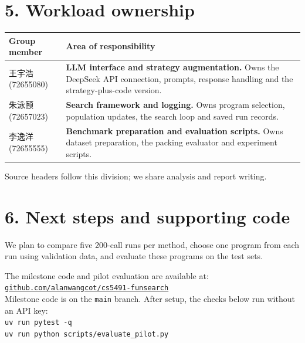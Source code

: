 \documentclass[12pt,a4paper]{article}
\begin{document}
\section*{5. Workload ownership}
\begin{tabularx}{\linewidth}{@{}p{4.1cm}Y@{}}
\toprule
\textbf{Group member} & \textbf{Area of responsibility}\\
\midrule
王宇浩 (72655080) & \textbf{LLM interface and strategy augmentation.} Owns the DeepSeek API connection, prompts, response handling and the strategy-plus-code version.\\[4pt]
朱泳颐 (72657023) & \textbf{Search framework and logging.} Owns program selection, population updates, the search loop and saved run records.\\[4pt]
李逸洋 (72655555) & \textbf{Benchmark preparation and evaluation scripts.} Owns dataset preparation, the packing evaluator and experiment scripts.\\
\bottomrule
\end{tabularx}

Source headers follow this division; we share analysis and report writing.

\section*{6. Next steps and supporting code}
We plan to compare five 200-call runs per method, choose one program from each run using validation data, and evaluate these programs on the test sets.

The milestone code and pilot evaluation are available at:\\[3pt]
\href{https://github.com/alanwangcot/cs5491-funsearch/tree/main}{\texttt{github.com/alanwangcot/cs5491-funsearch}}\\[3pt]
Milestone code is on the \texttt{main} branch. After setup, the checks below run without an API key:\\[4pt]
\texttt{uv run pytest -q}\\[2pt]
\texttt{uv run python scripts/evaluate\_pilot.py}
\end{document}
